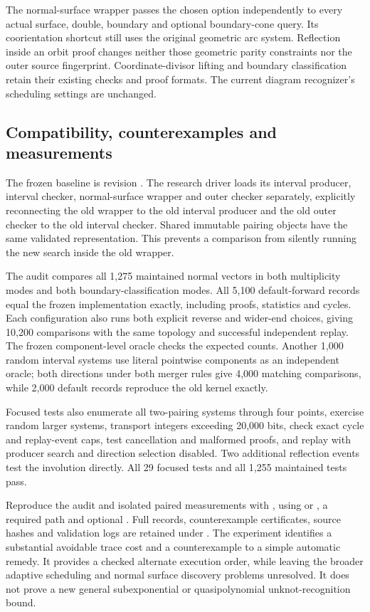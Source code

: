 The normal-surface wrapper passes the chosen option independently to every
actual surface, double, boundary and optional boundary-cone query. Its
coorientation shortcut still uses the original geometric arc system.
Reflection inside an orbit proof changes neither those geometric parity
constraints nor the outer source fingerprint. Coordinate-divisor lifting
and boundary classification retain their existing checks and proof formats.
The current diagram recognizer's scheduling settings are unchanged.

\subsection{Compatibility, counterexamples and measurements}

The frozen baseline is revision . The research driver loads
its interval producer, interval checker, normal-surface wrapper and outer
checker separately, explicitly reconnecting the old wrapper to the old
interval producer and the old outer checker to the old interval checker.
Shared immutable pairing objects have the same validated representation.
This prevents a comparison from silently running the new search inside
the old wrapper.

The audit compares all 1,275 maintained normal vectors in both multiplicity
modes and both boundary-classification modes. All 5,100 default-forward
records equal the frozen implementation exactly, including proofs,
statistics and cycles. Each configuration also runs both explicit reverse
and wider-end choices, giving 10,200 comparisons with the same topology
and successful independent replay. The frozen component-level oracle
checks the expected counts. Another 1,000 random interval systems use
literal pointwise components as an independent oracle; both directions
under both merger rules give 4,000 matching comparisons, while 2,000
default records reproduce the old kernel exactly.

Focused tests also enumerate all two-pairing systems through four points,
exercise random larger systems, transport integers exceeding 20,000 bits,
check exact cycle and replay-event caps, test cancellation and malformed
proofs, and replay with producer search and direction selection disabled.
Two additional reflection events test the involution directly.
All 29 focused tests and all 1,255 maintained tests pass.


Reproduce the audit and isolated paired measurements with
, using  or
, a required  path and optional
. Full records, counterexample certificates, source hashes
and validation logs are retained under .
The experiment identifies a substantial avoidable trace cost and a
counterexample to a simple automatic remedy. It provides a checked alternate
execution order, while leaving the broader adaptive scheduling and normal
surface discovery problems unresolved. It does not prove a new general
subexponential or quasipolynomial unknot-recognition bound.

